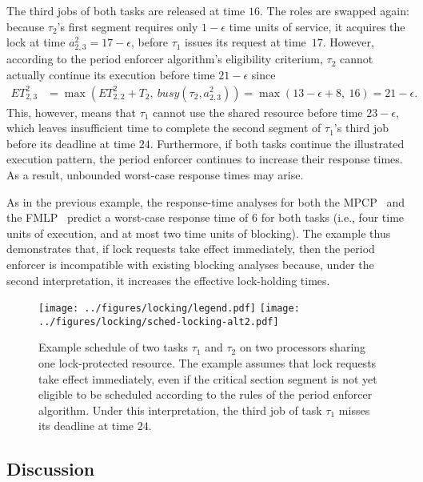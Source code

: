 The third jobs of both tasks are released at time $16$. The roles are swapped again: because $\tau_2$'s first segment requires only $1-\epsilon$ time units of service, it acquires the lock at time $a^2_{2,3} = 17 - \epsilon$, before $\tau_1$ issues its request at time~$17$. However, according to the period enforcer algorithm's eligibility criterium, $\tau_2$ cannot actually continue its execution before time $21- \epsilon$ since
\begin{align*}
	ET_{2,3}^2 & = \max\left(ET_{2,2}^2 + T_2,\ \mathit{busy}(\tau_2, a^2_{2,3})\right) =\max(13- \epsilon + 8,\ 16) = 21- \epsilon.
\end{align*}
This, however, means that $\tau_1$ cannot use the shared resource before time $23 - \epsilon$, which leaves insufficient time to complete the second segment of $\tau_1$'s third job before its deadline at time $24$.
Furthermore, if both tasks continue the illustrated execution pattern, the period enforcer continues to increase their response times. As a result,  unbounded worst-case response times may arise. 

As in the previous example,  the response-time analyses for both the MPCP~\cite{Br:13,LNR:09} and the   FMLP~\cite{Br:13} predict a worst-case response time of $6$ for both tasks (i.e., four time units of execution, and at most two time units of blocking). The example thus demonstrates that, if lock requests take effect immediately, then the period enforcer is incompatible with existing blocking analyses because, under the second interpretation, it increases the effective lock-holding times.


\ifpaper
\begin{figure}[t]
  \centering
  \texttt{[image: ../figures/locking/legend.pdf]}
  \texttt{[image: ../figures/locking/sched-locking-alt2.pdf]}
  \caption{Example schedule of two tasks $\tau_1$ and $\tau_2$ on two processors sharing one lock-protected resource. The example assumes that lock requests take effect immediately, even if the critical section segment is not yet eligible to be scheduled according to the rules of the period enforcer algorithm. Under this interpretation, the third job of task $\tau_1$ misses its deadline at time $24$.}
  \label{fig:locking-alt2}
  \end{figure}
\fi

\subsection{Discussion}

